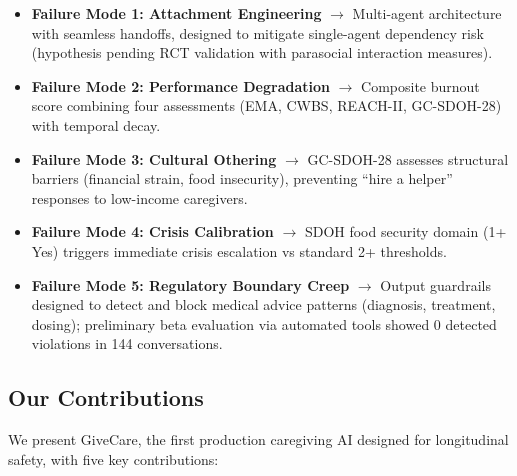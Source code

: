 \documentclass{article}
\begin{document}
\begin{itemize}
    \item \textbf{Failure Mode 1: Attachment Engineering} $\rightarrow$ Multi-agent architecture with seamless handoffs, designed to mitigate single-agent dependency risk (hypothesis pending RCT validation with parasocial interaction measures).
    \item \textbf{Failure Mode 2: Performance Degradation} $\rightarrow$ Composite burnout score combining four assessments (EMA, CWBS, REACH-II, GC-SDOH-28) with temporal decay.
    \item \textbf{Failure Mode 3: Cultural Othering} $\rightarrow$ GC-SDOH-28 assesses structural barriers (financial strain, food insecurity), preventing ``hire a helper'' responses to low-income caregivers.
    \item \textbf{Failure Mode 4: Crisis Calibration} $\rightarrow$ SDOH food security domain (1+ Yes) triggers immediate crisis escalation vs standard 2+ thresholds.
    \item \textbf{Failure Mode 5: Regulatory Boundary Creep} $\rightarrow$ Output guardrails designed to detect and block medical advice patterns (diagnosis, treatment, dosing); preliminary beta evaluation via automated tools showed 0 detected violations in 144 conversations.
\end{itemize}

\subsection{Our Contributions}

We present GiveCare, the first production caregiving AI designed for longitudinal safety, with five key contributions:
\end{document}
